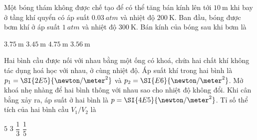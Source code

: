 \begin{ex}
	Một bóng thám không được chế tạo để có thể tăng bán kính lên tới $\SI{10}{\meter}$ khi bay ở tầng khí quyển có áp suất $\SI{0.03}{atm}$ và nhiệt độ $\SI{200}{\kelvin}$. Ban đầu, bóng được bơm khí ở áp suất $\SI{1}{atm}$ và nhiệt độ $\SI{300}{\kelvin}$. Bán kính của bóng sau khi bơm là
	
	\choice
	{$\SI{3.75}{\meter}$}
	{$\SI{3.45}{\meter}$}
	{$\SI{4.75}{\meter}$}
	{\True $\SI{3.56}{\meter}$}
\end{ex}
\begin{ex}
Hai bình cầu được nối với nhau bằng một ống có khoá, chứa hai chất khí không tác dụng hoá học với nhau, ở cùng nhiệt độ. Áp suất khí trong hai bình là $p_1=\SI{2E5}{\newton/\meter^2}$ và $p_2=\SI{E6}{\newton/\meter^2}$. Mở khoá nhẹ nhàng để hai bình thông với nhau sao cho nhiệt độ không đổi. Khi cân bằng xảy ra, áp suất ở hai bình là $p=\SI{4E5}{\newton/\meter^2}$. Tỉ số thể tích của hai bình cầu $V_1/V_2$ là
	
	\choice
	{$5$}
	{\True $3$}
	{$\dfrac{1}{3}$}
	{$\dfrac{1}{5}$}
\end{ex}
